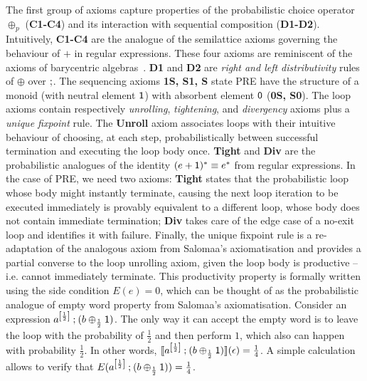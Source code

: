 The first group of axioms capture properties of the probabilistic choice operator $\oplus_p$ (\textbf{C1-C4}) and its interaction with sequential composition (\textbf{D1-D2}). Intuitively, \textbf{C1-C4} are the analogue of the semilattice axioms governing the behaviour of $+$ in regular expressions. These four axioms are reminiscent of the axioms of barycentric algebras~\cite{Stone:1949:Postulates}. \textbf{D1} and \textbf{D2} are \emph{right and left distributivity} rules of $\oplus$ over $\mathbin{;}$. The sequencing axioms \textbf{1S, S1, S}  state {PRE} have the structure of a monoid (with neutral element $\mathsf{1}$) with absorbent element $\mathsf{0}$ (\textbf{0S, S0}). The loop axioms contain respectively \emph{unrolling}, \emph{tightening}, and \emph{divergency} axioms plus a \emph{unique fixpoint} rule. The \textbf{Unroll} axiom associates loops with their intuitive behaviour of choosing, at each step, probabilistically between successful termination and executing the loop body once. \textbf{Tight} and \textbf{Div} are the probabilistic analogues of the identity $(e + \mathsf{1})^{*} \equiv e^{*}$ from regular expressions. In the case of {PRE}, we need two axioms: \textbf{Tight} states that the probabilistic loop whose body might instantly terminate, causing the next loop iteration to be executed immediately is provably equivalent to a different loop, whose body does not contain immediate termination; \textbf{Div} takes care of the edge case of a no-exit loop and identifies it with failure. Finally, the unique fixpoint rule is a re-adaptation of the analogous axiom from Salomaa's axiomatisation and provides a partial converse to the loop unrolling axiom, given the loop body is productive -- i.e. cannot immediately terminate. This productivity property is formally written using the side condition $E(e) = 0$, which can be thought of as the probabilistic analogue of empty word property from Salomaa’s axiomatisation. Consider an expression $a^{\left[\frac{1}{2}\right]} \mathbin{;} (b \oplus_{\frac{1}{2}} \mathsf{1})$. The only way it can accept the empty word is to leave the loop with the probability of $\frac{1}{2}$ and then perform $1$, which also can happen with probability $\frac{1}{2}$. In other words, $\llbracket a^{\left[\frac{1}{2}\right]} \mathbin{;} (b \oplus_{\frac{1}{2}} \mathsf{1})\rrbracket(\epsilon) = \frac{1}{4}$. A simple calculation allows to verify that $E( a^{\left[\frac{1}{2}\right]} \mathbin{;} (b \oplus_{\frac{1}{2}} \mathsf{1})) = \frac{1}{4}$.





